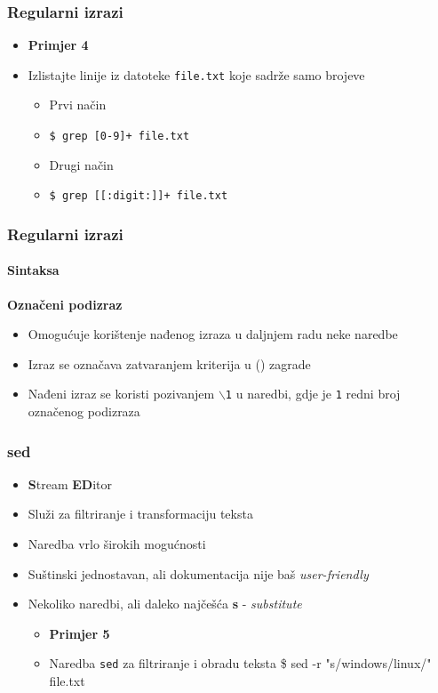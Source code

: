 \documentclass[table,usenames,dvipsnames]{beamer}
\newcommand{\shell}[1]{\texttt{#1}}
\begin{document}
\begin{frame}[t]
\frametitle{Regularni izrazi}
\begin{itemize}
\item \textbf{Primjer 4}
\item[] Izlistajte linije iz datoteke \shell{file.txt} koje sadrže samo brojeve
\begin{itemize}
	\item Prvi način
	\item[] \shell{\$ grep [0-9]+ file.txt}
	\item Drugi način
	\item[] \shell{\$ grep [[:digit:]]+ file.txt}
\end{itemize}
\end{itemize}
\end{frame}

\begin{frame}[fragile]
\frametitle{Regularni izrazi}
\framesubtitle{Sintaksa}
\textbf{Označeni podizraz}
\begin{itemize}
	\item Omogućuje korištenje nađenog izraza u daljnjem radu neke naredbe
	\item Izraz se označava zatvaranjem kriterija u () zagrade
	\item Nađeni izraz se koristi pozivanjem \shell{$\backslash$1} u naredbi, gdje je \shell{1} redni broj označenog podizraza
\end{itemize}
\vfill
\vfill
\end{frame}


\begin{frame}
\frametitle{sed}
\begin{itemize}
	\item \textbf{S}tream \textbf{ED}itor
	\item Služi za filtriranje i transformaciju teksta
	\item Naredba vrlo širokih mogućnosti
	\item Suštinski jednostavan, ali dokumentacija nije baš \textit{user-friendly}
	\item Nekoliko naredbi, ali daleko najčešća \textbf{s} - \textit{substitute}

	\begin{itemize}
		\item \textbf{Primjer 5}
		\item[] Naredba \shell{sed} za filtriranje i obradu teksta
		\small \$ sed -r "s/windows/linux/" file.txt
	\end{itemize}
\end{itemize}
\end{frame}
\end{document}
